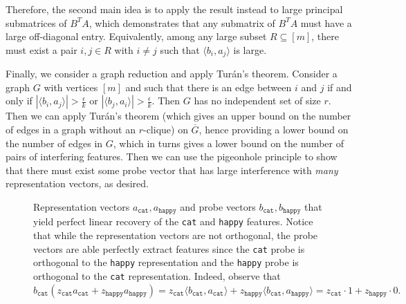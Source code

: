 \documentclass[11pt]{article}
\begin{document}
Therefore, the second main idea is to apply the result instead to large principal submatrices of $B^TA$, which demonstrates that any submatrix of $B^TA$ must have a large off-diagonal entry. Equivalently, among any large subset $R\subseteq [m]$, there must exist a pair $i,j\in R$ with $i\neq j$ such that $\langle b_i, a_j \rangle$ is large. 

Finally, we consider a graph reduction and apply Tur\'an's theorem. Consider a graph $G$ with vertices $[m]$ and such that there is an edge between $i$ and $j$ if and only if $|\langle b_i, a_j\rangle| > \frac{\epsilon}{k}$ or $|\langle b_j, a_i\rangle| > \frac{\epsilon}{k}$. Then $G$ has no independent set of size $r$. Then we can apply Tur\'an's theorem (which gives an upper bound on the number of edges in a graph without an $r$-clique) on $\overline{G}$, hence providing a lower bound on the number of edges in $G$, which in turns gives a lower bound on the number of pairs of interfering features. Then we can use the pigeonhole principle to show that there must exist some probe vector that has large interference with \textit{many} representation vectors, as desired.

\begin{figure}
\centering
{}
\caption{Representation vectors $a_{\texttt{cat}}, a_{\texttt{happy}}$ and probe vectors $b_{\texttt{cat}}, b_{\texttt{happy}}$ that yield perfect linear recovery of the \texttt{cat} and \texttt{happy} features. Notice that while the representation vectors are not orthogonal, the probe vectors are able perfectly extract features since the \texttt{cat} probe is orthogonal to the \texttt{happy} representation and the \texttt{happy} probe is orthogonal to the \texttt{cat} representation. Indeed, observe that $b_{\texttt{cat}}(z_{\texttt{cat}}a_{\texttt{cat}} + z_{\texttt{happy}}a_{\texttt{happy}}) = z_{\texttt{cat}}\langle b_{\texttt{cat}}, a_{\texttt{cat}}\rangle + z_{\texttt{happy}}\langle b_{\texttt{cat}}, a_{\texttt{happy}}\rangle = z_{\texttt{cat}}\cdot 1 + z_{\texttt{happy}}\cdot 0.$}
\end{figure}
\end{document}
